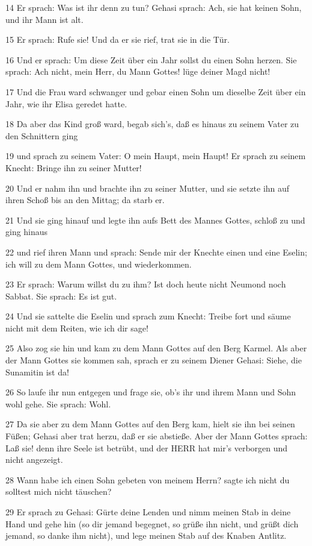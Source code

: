 \par 14 Er sprach: Was ist ihr denn zu tun? Gehasi sprach: Ach, sie hat keinen Sohn, und ihr Mann ist alt.
\par 15 Er sprach: Rufe sie! Und da er sie rief, trat sie in die Tür.
\par 16 Und er sprach: Um diese Zeit über ein Jahr sollst du einen Sohn herzen. Sie sprach: Ach nicht, mein Herr, du Mann Gottes! lüge deiner Magd nicht!
\par 17 Und die Frau ward schwanger und gebar einen Sohn um dieselbe Zeit über ein Jahr, wie ihr Elisa geredet hatte.
\par 18 Da aber das Kind groß ward, begab sich's, daß es hinaus zu seinem Vater zu den Schnittern ging
\par 19 und sprach zu seinem Vater: O mein Haupt, mein Haupt! Er sprach zu seinem Knecht: Bringe ihn zu seiner Mutter!
\par 20 Und er nahm ihn und brachte ihn zu seiner Mutter, und sie setzte ihn auf ihren Schoß bis an den Mittag; da starb er.
\par 21 Und sie ging hinauf und legte ihn aufs Bett des Mannes Gottes, schloß zu und ging hinaus
\par 22 und rief ihren Mann und sprach: Sende mir der Knechte einen und eine Eselin; ich will zu dem Mann Gottes, und wiederkommen.
\par 23 Er sprach: Warum willst du zu ihm? Ist doch heute nicht Neumond noch Sabbat. Sie sprach: Es ist gut.
\par 24 Und sie sattelte die Eselin und sprach zum Knecht: Treibe fort und säume nicht mit dem Reiten, wie ich dir sage!
\par 25 Also zog sie hin und kam zu dem Mann Gottes auf den Berg Karmel. Als aber der Mann Gottes sie kommen sah, sprach er zu seinem Diener Gehasi: Siehe, die Sunamitin ist da!
\par 26 So laufe ihr nun entgegen und frage sie, ob's ihr und ihrem Mann und Sohn wohl gehe. Sie sprach: Wohl.
\par 27 Da sie aber zu dem Mann Gottes auf den Berg kam, hielt sie ihn bei seinen Füßen; Gehasi aber trat herzu, daß er sie abstieße. Aber der Mann Gottes sprach: Laß sie! denn ihre Seele ist betrübt, und der HERR hat mir's verborgen und nicht angezeigt.
\par 28 Wann habe ich einen Sohn gebeten von meinem Herrn? sagte ich nicht du solltest mich nicht täuschen?
\par 29 Er sprach zu Gehasi: Gürte deine Lenden und nimm meinen Stab in deine Hand und gehe hin (so dir jemand begegnet, so grüße ihn nicht, und grüßt dich jemand, so danke ihm nicht), und lege meinen Stab auf des Knaben Antlitz.
